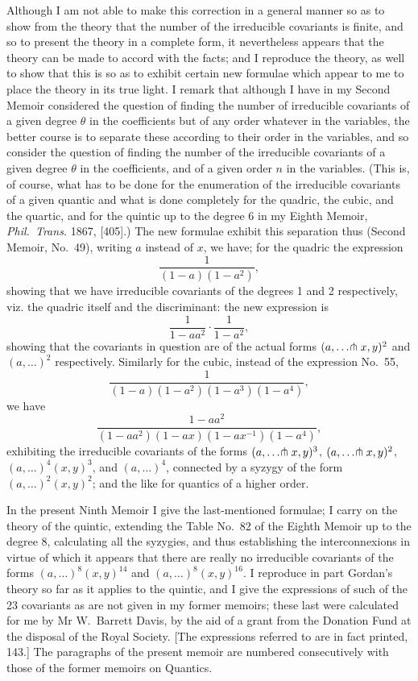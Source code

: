 \documentclass[11pt,a4paper]{article}
\begin{document}
Although I am not able to make this correction in a general manner so as to show from the theory that the number of the irreducible covariants is finite, and so to present the theory in a complete form, it nevertheless appears that the theory can be made to accord with the facts; and I reproduce the theory, as well to show that this is so as to exhibit certain new formulae which appear to me to place the theory in its true light. I remark that although I have in my Second Memoir considered the question of finding the number of irreducible covariants of a given degree $\theta$ in the coefficients but of any order whatever in the variables, the better course is to separate these according to their order in the variables, and so consider the question of finding the number of the irreducible covariants of a given degree $\theta$ in the coefficients, and of a given order $n$ in the variables. (This is, of course, what has to be done for the enumeration of the irreducible covariants of a given quantic and what is done completely for the quadric, the cubic, and the quartic, and for the quintic up to the degree 6 in my Eighth Memoir, \textit{Phil.\ Trans.} 1867, [405].) The new formulae exhibit this separation thus (Second Memoir, No.~49), writing $a$ instead of $x$, we have; for the quadric the expression
\[
\frac{1}{(1-a)(1-a^{2})},
\]
showing that we have irreducible covariants of the degrees 1 and 2 respectively, viz. the quadric itself and the discriminant: the new expression is
\[
\frac{1}{1-aa^{2}} \cdot \frac{1}{1-a^{2}},
\]
showing that the covariants in question are of the actual forms $(a, \ldots \hspace{-0.2em}\pitchfork x, y)^{2}$ and $(a, \ldots)^{2}$ respectively. Similarly for the cubic, instead of the expression No.~55,
\[
\frac{1}{(1-a)(1-a^{2})(1-a^{3})(1-a^{4})},
\]
we have
\[
\frac{1-aa^{2}}{(1-aa^{2})(1-ax)(1-ax^{-1})(1-a^{4})},
\]
exhibiting the irreducible covariants of the forms $(a, \ldots \hspace{-0.2em}\pitchfork x, y)^{3}$, $(a, \ldots \hspace{-0.2em}\pitchfork x, y)^{2}$, $(a, \ldots)^{4}(x, y)^{3}$, and $(a, \ldots)^{4}$, connected by a syzygy of the form $(a, \ldots)^{2}(x, y)^{2}$; and the like for quantics of a higher order.

In the present Ninth Memoir I give the last-mentioned formulae; I carry on the theory of the quintic, extending the Table No.~82 of the Eighth Memoir up to the degree 8, calculating all the syzygies, and thus establishing the interconnexions in virtue of which it appears that there are really no irreducible covariants of the forms $(a, \ldots)^{8}(x, y)^{14}$ and $(a, \ldots)^{8}(x, y)^{16}$. I reproduce in part Gordan's theory so far as it applies to the quintic, and I give the expressions of such of the 23 covariants as are not given in my former memoirs; these last were calculated for me by Mr W.~Barrett Davis, by the aid of a grant from the Donation Fund at the disposal of the Royal Society. [The expressions referred to are in fact printed, 143.] The paragraphs of the present memoir are numbered consecutively with those of the former memoirs on Quantics.
\end{document}
